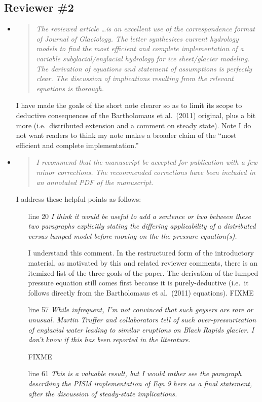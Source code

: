 \documentclass[11pt,reqno]{amsart}
\newcommand{\reply}[2]{
\medskip\medskip
\item  \begin{quote}
\emph{#1}
\end{quote}

\medskip
\noindent #2}
\begin{document}
\subsection*{Reviewer \#2}  \begin{itemize}
\reply{The reviewed article \dots is an excellent use of the correspondence format of Journal of Glaciology.  The letter synthesizes current hydrology models to find the most efficient and complete implementation of a variable subglacial/englacial hydrology for ice sheet/glacier modeling.  The derivation of equations and statement of assumptions is perfectly clear.  The discussion of implications resulting from the relevant equations is thorough.}
{I have made the goals of the short note clearer so as to limit its scope to deductive consequences of the Bartholomaus et al.~(2011) original, plus a bit more (i.e.~distributed extension and a comment on steady state).  Note I do not want readers to think my note makes a broader claim of the ``most efficient and complete implementation.''}

\reply{I recommend that the manuscript be accepted for publication with a few minor corrections. The recommended corrections have been included in an annotated PDF of the manuscript.}
{I address these helpful points as follows:

\medskip
\begin{itemize}
\item[line 20] \emph{I think it would be useful to add a sentence or two between these two paragraphs explicitly stating the differing applicability of a distributed versus lumped model before moving on the the pressure equation(s).}

I understand this comment.  In the restructured form of the introductory material, as motivated by this and related reviewer comments, there is an itemized list of the three goals of the paper.  The derivation of the lumped pressure equation still comes first because it is purely-deductive (i.e.~it follows directly from the Bartholomaus et al.~(2011) equations).  FIXME

\item[line 57]  \emph{While infrequent, I’m not convinced that such geysers are rare or unusual.  Martin Truffer and collaborators tell of such over-pressurization of  englacial water leading to similar eruptions on Black Rapids glacier.   I don’t know if this has been reported in the literature.}

FIXME

\item[line 61]  \emph{This is a valuable result, but I would rather see the paragraph describing the PISM implementation of Eqn 9 here as a final statement, after the discussion of steady-state implications.}


\end{itemize}}
\end{itemize}
\end{document}
